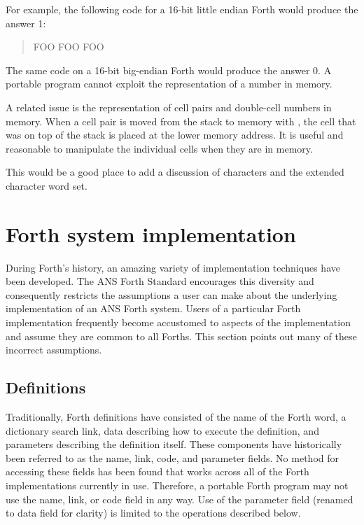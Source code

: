 For example, the following code for a 16-bit little endian Forth
would produce the answer 1:

\begin{quote}\ttfamily
	 FOO
	 FOO \word{!}
	\quad FOO 
\end{quote}

The same code on a 16-bit big-endian Forth would produce the
answer 0. A portable program cannot exploit the representation
of a number in memory.

A related issue is the representation of cell pairs and double-cell
numbers in memory. When a cell pair is moved from the stack to memory
with , the cell that was on top of the stack is placed at the
lower memory address. It is useful and reasonable to manipulate the
individual cells when they are in memory.

\ifrelease\else
\begin{editor}
This would be a good place to add a discussion
of characters and the extended character word set.
\end{editor}
\fi

\section{Forth system implementation} %

During Forth's history, an amazing variety of implementation techniques
have been developed. The ANS Forth Standard encourages this diversity
and consequently restricts the assumptions a user can make about the
underlying implementation of an ANS Forth system. Users of a particular
Forth implementation frequently become accustomed to aspects of the
implementation and assume they are common to all Forths. This section
points out many of these incorrect assumptions.

\subsection{Definitions} %

Traditionally, Forth definitions have consisted of the name of the
Forth word, a dictionary search link, data describing how to execute
the definition, and parameters describing the definition itself. These
components have historically been referred to as the name, link, code,
and parameter fields.
No method for accessing these fields has been found that works
across all of the Forth implementations currently in use. Therefore,
a portable Forth program may not use the name, link, or code field
in any way. Use of the parameter field (renamed to data field for
clarity) is limited to the operations described below.

